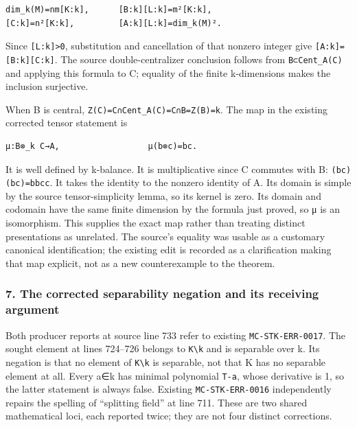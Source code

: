 \documentclass[11pt]{article}
\begin{document}
\begin{verbatim}
dim_k(M)=nm[K:k],      [B:k][L:k]=m²[K:k],
[C:k]=n²[K:k],         [A:k][L:k]=dim_k(M)².
\end{verbatim}

Since \texttt{{[}L:k{]}\textgreater{}0}, substitution and cancellation of that nonzero integer give \texttt{{[}A:k{]}={[}B:k{]}{[}C:k{]}}. The source double-centralizer conclusion follows from \texttt{B⊂Cent\_A(C)} and applying this formula to C; equality of the finite k-dimensions makes the inclusion surjective.

When B is central, \texttt{Z(C)=C∩Cent\_A(C)=C∩B=Z(B)=k}. The map in the existing corrected tensor statement is

\begin{verbatim}
μ:B⊗_k C→A,                  μ(b⊗c)=bc.
\end{verbatim}

It is well defined by k-balance. It is multiplicative since C commutes with B: \texttt{(bc)(b\textquotesingle{}c\textquotesingle{})=bb\textquotesingle{}cc\textquotesingle{}}. It takes the identity to the nonzero identity of A. Its domain is simple by the source tensor-simplicity lemma, so its kernel is zero. Its domain and codomain have the same finite dimension by the formula just proved, so μ is an isomorphism. This supplies the exact map rather than treating distinct presentations as unrelated. The source's equality was usable as a customary canonical identification; the existing edit is recorded as a clarification making that map explicit, not as a new counterexample to the theorem.

\subsubsection{7. The corrected separability negation and its receiving argument}\label{the-corrected-separability-negation-and-its-receiving-argument}

Both producer reports at source line 733 refer to existing \texttt{MC-STK-ERR-0017}. The sought element at lines 724--726 belongs to \texttt{K\textbackslash{}k} and is separable over k. Its negation is that no element of \texttt{K\textbackslash{}k} is separable, not that K has no separable element at all. Every a∈k has minimal polynomial \texttt{T-a}, whose derivative is 1, so the latter statement is always false. Existing \texttt{MC-STK-ERR-0016} independently repairs the spelling of ``splitting field'' at line 711. These are two shared mathematical loci, each reported twice; they are not four distinct corrections.
\end{document}
